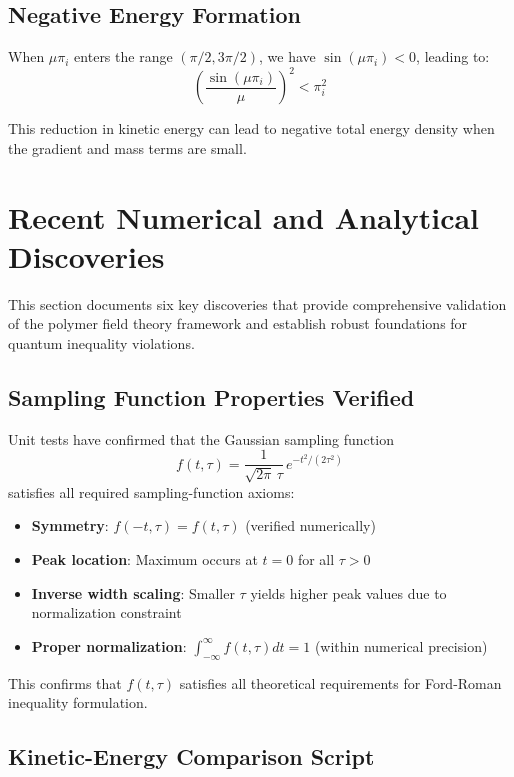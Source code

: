 \documentclass[12pt]{article}
\begin{document}
\subsection{Negative Energy Formation}

When $\mu \pi_i$ enters the range $(\pi/2, 3\pi/2)$, we have $\sin(\mu \pi_i) < 0$, leading to:
\begin{equation}
\left(\frac{\sin(\mu \pi_i)}{\mu}\right)^2 < \pi_i^2
\end{equation}

This reduction in kinetic energy can lead to negative total energy density when the gradient and mass terms are small.

\section{Recent Numerical and Analytical Discoveries}

This section documents six key discoveries that provide comprehensive validation of the polymer field theory framework and establish robust foundations for quantum inequality violations.

\subsection{Sampling Function Properties Verified}

Unit tests have confirmed that the Gaussian sampling function
\begin{equation}
f(t,\tau) = \frac{1}{\sqrt{2\pi}\,\tau}\,e^{-t^2/(2\tau^2)}
\end{equation}
satisfies all required sampling-function axioms:
\begin{itemize}
\item \textbf{Symmetry}: $f(-t,\tau) = f(t,\tau)$ (verified numerically)
\item \textbf{Peak location}: Maximum occurs at $t = 0$ for all $\tau > 0$
\item \textbf{Inverse width scaling}: Smaller $\tau$ yields higher peak values due to normalization constraint
\item \textbf{Proper normalization}: $\int_{-\infty}^{\infty} f(t,\tau) dt = 1$ (within numerical precision)
\end{itemize}

This confirms that $f(t,\tau)$ satisfies all theoretical requirements for Ford-Roman inequality formulation.

\subsection{Kinetic-Energy Comparison Script}
\end{document}
